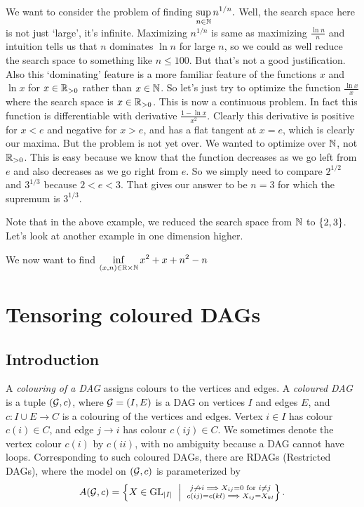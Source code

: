 \begin{ex}
We want to consider the problem of finding $\displaystyle \sup\limits_{n\in\mathbb{N}}n^{1/n}.$ Well, the search space here is not just `large', it's infinite. Maximizing $n^{1/n}$ is same as maximizing $\frac{\ln n}{n}$ and intuition tells us that $n$ dominates $\ln n$ for large $n$, so we could as well reduce the search space to something like $n\leq 100$. But that's not a good justification. Also this `dominating' feature is a more familiar feature of the functions $x$ and $\ln x$ for $x\in \mathbb{R}_{>0}$ rather than $x\in\mathbb{N}$. So let's just try to optimize the function $\frac{\ln x}{x}$ where the search space is $x\in\mathbb{R}_{>0}$. This is now a continuous problem. In fact this function is differentiable with derivative $\frac{1-\ln x}{x^2}$. Clearly this derivative is positive for $x<e$ and negative for $x>e$, and has a flat tangent at $x=e$, which is clearly our maxima. But the problem is not yet over. We wanted to optimize over $\mathbb{N}$, not $\mathbb{R}_{>0}$.  This is easy because we know that the function decreases as we go left from $e$ and also decreases as we go right from $e$. So we simply need to compare $2^{1/2}$ and $3^{1/3}$ because $2<e<3$. That gives our answer to be $n=3$ for which the supremum is $3^{1/3}$.
\end{ex}

Note that in the above example, we reduced the search space from $\mathbb{N}$ to $\left\{2,3\right\}$. Let's look at another example in one dimension higher.

\begin{ex}
We now want to find $\displaystyle \inf\limits_{(x,n)\in\mathbb{R}\times\mathbb{N}}x^2+x+n^2-n$ 

\end{ex}


\section{Tensoring coloured DAGs}

\subsection{Introduction}

A \emph{colouring of a DAG} assigns colours to the vertices and edges. A \emph{coloured DAG} is a tuple $({\mathcal{G}},c)$, where ${\mathcal{G}} = (I,E)$ is a DAG on vertices $I$ and edges $E$, and $c:I\cup E\to C$ is a colouring of the vertices and edges. Vertex $i \in I$ has colour $c(i) \in C$, and edge $j \to i$ has colour $c(ij) \in C$. We sometimes denote the vertex colour $c(i)$ by $c(ii)$, with no ambiguity because a DAG cannot have loops. Corresponding to such coloured DAGs, there are RDAGs (Restricted DAGs), where the model on $({\mathcal{G}},c)$ is parameterized by $$A(\cG,c) = \set{X\in \GL_{\abs{I}} \st \substack{j\not\to i \implies X_{ij}=0 \text{ for } i\neq j\\c(ij) = c(kl)\implies X_{ij} = X_{kl}}}.$$

